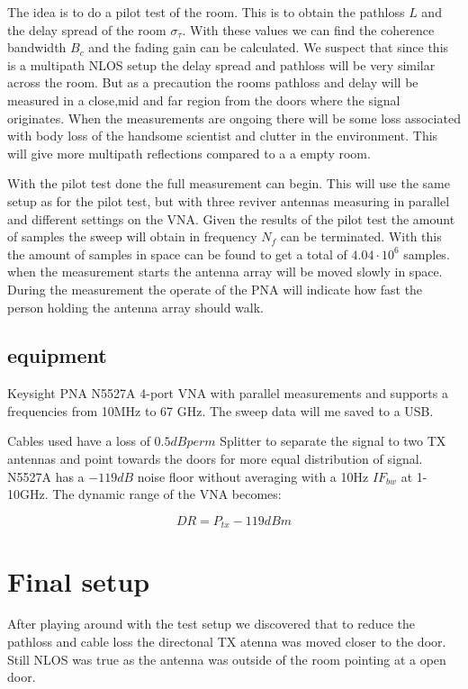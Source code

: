 The idea is to do a pilot test of the room. This is to obtain the pathloss $L$ and the delay spread of the room $\sigma_\tau$. With these values we can find the coherence bandwidth $B_c$ and the fading gain can be calculated. 
We suspect that since this is a multipath NLOS setup the delay spread and pathloss will be very similar across the room. But as a precaution the rooms pathloss and delay will be measured in a close,mid and far region from the doors where the signal originates. When the measurements are ongoing there will be some loss associated with body loss of the handsome scientist and clutter in the environment. This will give more multipath reflections compared to a a empty room.

With the pilot test done the full measurement can begin. This will use the same setup as for the pilot test, but with three reviver antennas measuring in parallel and different settings on the VNA. Given the results of the pilot test the amount of samples the sweep will obtain in frequency $N_f$ can be terminated. With this the amount of samples in space can be found to get a total of $4.04 \cdot 10^6$ samples. when the measurement starts the antenna array will be moved slowly in space. During the measurement the operate of the PNA will indicate how fast the person holding the antenna array should walk.



\subsection{equipment}
\label{equip}
Keysight PNA N5527A 4-port VNA with parallel measurements and supports a frequencies from 10MHz to 67 GHz. The sweep data will me saved to a USB.

Cables used have a loss of $0.5dB per m$ 
Splitter to separate the signal to two TX antennas and point towards the doors for more equal distribution of signal.
N5527A has a $-119dB$ noise floor without averaging with a 10Hz $IF_{bw}$ at 1-10GHz. The dynamic range of the VNA becomes:

\begin{equation}
DR = P_{tx}-119dBm 
\label{NFvna}
\end{equation}


\section{Final setup}
After playing around with the test setup we discovered that to reduce the pathloss and cable loss the directonal TX atenna was moved closer to the door. Still NLOS was true as the antenna was outside of the room pointing at a open door.





